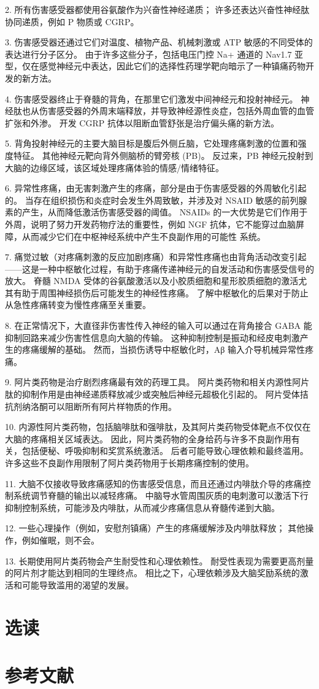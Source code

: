 2. 所有伤害感受器都使用谷氨酸作为兴奋性神经递质； 许多还表达兴奋性神经肽协同递质，例如 P 物质或 CGRP。 

3. 伤害感受器还通过它们对温度、植物产品、机械刺激或 ATP 敏感的不同受体的表达进行分子区分。 
由于许多这些分子，包括电压门控 Na+ 通道的 Nav1.7 亚型，仅在感觉神经元中表达，因此它们的选择性药理学靶向暗示了一种镇痛药物开发的新方法。 


4. 伤害感受器终止于脊髓的背角，在那里它们激发中间神经元和投射神经元。 
神经肽也从伤害感受器的外周末端释放，并导致神经源性炎症，包括外周血管的血管扩张和外渗。 
开发 CGRP 抗体以阻断血管舒张是治疗偏头痛的新方法。 


5. 背角投射神经元的主要大脑目标是腹后外侧丘脑，它处理疼痛刺激的位置和强度特征。 
其他神经元靶向背外侧脑桥的臂旁核 (PB)。 
反过来，PB 神经元投射到大脑的边缘区域，该区域处理疼痛体验的情感/情绪特征。
 

6. 异常性疼痛，由无害刺激产生的疼痛，部分是由于伤害感受器的外周敏化引起的。 
当存在组织损伤和炎症时会发生外周致敏，并涉及对 NSAID 敏感的前列腺素的产生，从而降低激活伤害感受器的阈值。 
NSAIDs 的一大优势是它们作用于外周，说明了努力开发药物疗法的重要性，例如 NGF 抗体，它不能穿过血脑屏障，从而减少它们在中枢神经系统中产生不良副作用的可能性 系统。 


7. 痛觉过敏（对疼痛刺激的反应加剧疼痛）和异常性疼痛也由背角活动改变引起——这是一种中枢敏化过程，有助于疼痛传递神经元的自发活动和伤害感受信号的放大。 
脊髓 NMDA 受体的谷氨酸激活以及小胶质细胞和星形胶质细胞的激活尤其有助于周围神经损伤后可能发生的神经性疼痛。 
了解中枢敏化的后果对于防止从急性疼痛转变为慢性疼痛至关重要。 


8. 在正常情况下，大直径非伤害性传入神经的输入可以通过在背角接合 GABA 能抑制回路来减少伤害性信息向大脑的传输。 
这种抑制控制是振动和经皮电刺激产生的疼痛缓解的基础。 
然而，当损伤诱导中枢敏化时，Aβ 输入介导机械异常性疼痛。
 

9. 阿片类药物是治疗剧烈疼痛最有效的药理工具。 
阿片类药物和相关内源性阿片肽的抑制作用是由神经递质释放减少或突触后神经元超极化引起的。 
阿片受体拮抗剂纳洛酮可以阻断所有阿片样物质的作用。 


10. 内源性阿片类药物，包括脑啡肽和强啡肽，及其阿片类药物受体靶点不仅仅在大脑的疼痛相关区域表达。
因此，阿片类药物的全身给药与许多不良副作用有关，包括便秘、呼吸抑制和奖赏系统激活。 
后者可能导致心理依赖和最终滥用。
许多这些不良副作用限制了阿片类药物用于长期疼痛控制的使用。


11. 大脑不仅接收导致疼痛感知的伤害感受信息，而且还通过内啡肽介导的疼痛控制系统调节脊髓的输出以减轻疼痛。 
中脑导水管周围灰质的电刺激可以激活下行抑制控制系统，可能涉及内啡肽，从而减少疼痛信息从脊髓传递到大脑。


12. 一些心理操作（例如，安慰剂镇痛）产生的疼痛缓解涉及内啡肽释放；
其他操作，例如催眠，则不会。


13. 长期使用阿片类药物会产生耐受性和心理依赖性。 
耐受性表现为需要更高剂量的阿片剂才能达到相同的生理终点。 
相比之下，心理依赖涉及大脑奖励系统的激活和可能导致滥用的渴望的发展。


\section{选读}
\section{参考文献}